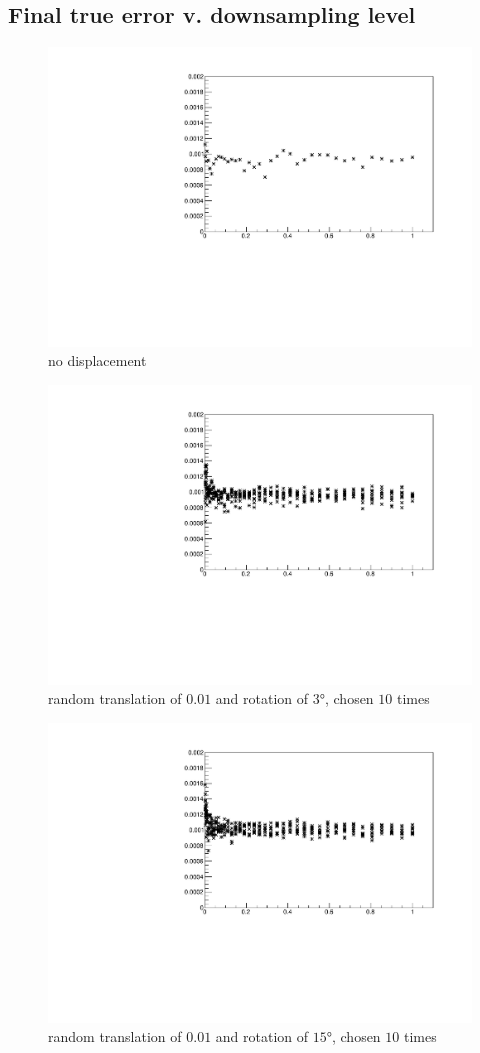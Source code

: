 \subsection{Final true error v. downsampling level} \label{sec:bunny_hilo}

\begin{figure}[H]
\centering
\includegraphics[width=.7\textwidth]{fig/bunny_globmin.pdf}
\caption{no displacement}
\label{fig:bunny_globmin}
\end{figure}
\begin{figure}[H]
\centering
\includegraphics[width=.7\textwidth]{fig/bunny_globsmall.pdf}
\caption{random translation of $0.01$ and rotation of $3 \si{\degree}$, chosen $10$ times}
\label{fig:bunny_globsmall}
\end{figure}
\begin{figure}[H]
\centering
\includegraphics[width=.7\textwidth]{fig/bunny_globmed.pdf}
\caption{random translation of $0.01$ and rotation of $15 \si{\degree}$, chosen $10$ times}
\label{fig:bunny_globmed}
\end{figure}


